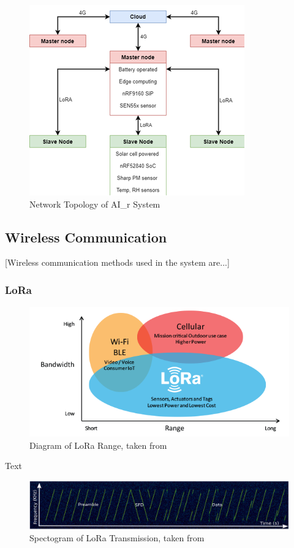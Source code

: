 \documentclass[a4paper,twoside,12pt]{report}
\begin{document}
\begin{figure}[ht]
	\centering
	\includegraphics[width=0.5\linewidth]{images/Network_topology_of_AI_r_system_cropped.png}
	\caption{Network Topology of AI\_r System}
	\label{fig:NetworkTopology}
\end{figure}



\subsection{Wireless Communication}
[Wireless communication methods used in the system are...]
\subsubsection{LoRa}

\begin{figure}[ht]
	\centering
	\includegraphics[width=0.5\linewidth]{images/LoRa_Why_Range.png}
	\caption{Diagram of LoRa Range, taken from \cite{Semtech_2023}}
	\label{fig:LoRaRange}
\end{figure}

Text 

\begin{figure}[ht]
	\centering
	\includegraphics[width=0.8\linewidth]{images/LoRa transmission spectogram.png}
	\caption{Spectogram of LoRa Transmission, taken from \cite{Liando2019KnownStudy}}
	\label{fig:LoRaTransmissionSpectogram}
\end{figure}
\end{document}
